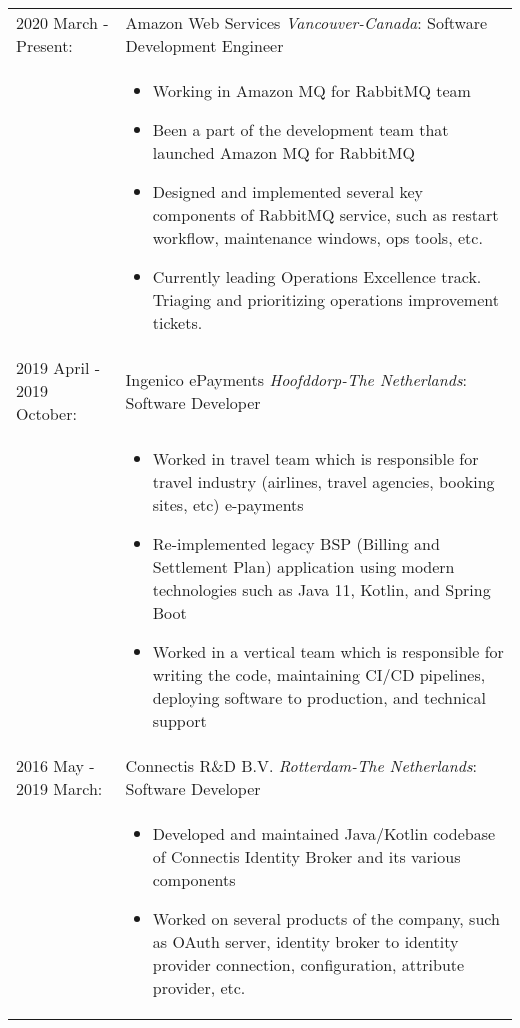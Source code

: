 \documentclass[11pt]{article}
\begin{document}
\begin{tabular}{p{5.5cm} p{12.5cm}}
\\
2020 March - Present:   & Amazon Web Services \textit{Vancouver-Canada}: Software Development Engineer \\
							 &
\begin{itemize}
\setlength\itemsep{0em}
\vspace{-15pt}
\item Working in Amazon MQ for RabbitMQ team
\item Been a part of the development team that launched Amazon MQ for RabbitMQ
\item Designed and implemented several key components of RabbitMQ service, such as restart workflow, maintenance windows, ops tools, etc.
\item Currently leading Operations Excellence track. Triaging and prioritizing operations improvement tickets.
\vspace{-10pt}
\end{itemize}\\
2019 April - 2019 October:   & Ingenico ePayments \textit{Hoofddorp-The Netherlands}: Software Developer \\
							 &
\begin{itemize}
\setlength\itemsep{0em}
\vspace{-15pt}
\item Worked in travel team which is responsible for travel industry (airlines, travel agencies, booking sites, etc) e-payments
\item Re-implemented legacy BSP (Billing and Settlement Plan) application using modern technologies such as Java 11, Kotlin, and Spring Boot
\item Worked in a vertical team which is responsible for writing the code, maintaining CI/CD pipelines, deploying software to production, and technical support
\vspace{-10pt}
\end{itemize}\\
2016 May - 2019 March:       & Connectis R\&D B.V. \textit{Rotterdam-The Netherlands}: Software Developer \\
							 &
\begin{itemize}
\setlength\itemsep{0em}
\vspace{-15pt}
\item Developed and maintained Java/Kotlin codebase of Connectis Identity Broker and its various components
\item Worked on several products of the company, such as OAuth server, identity broker to identity provider connection, configuration, attribute provider, etc.

\end{itemize}
\end{tabular}
\end{document}
